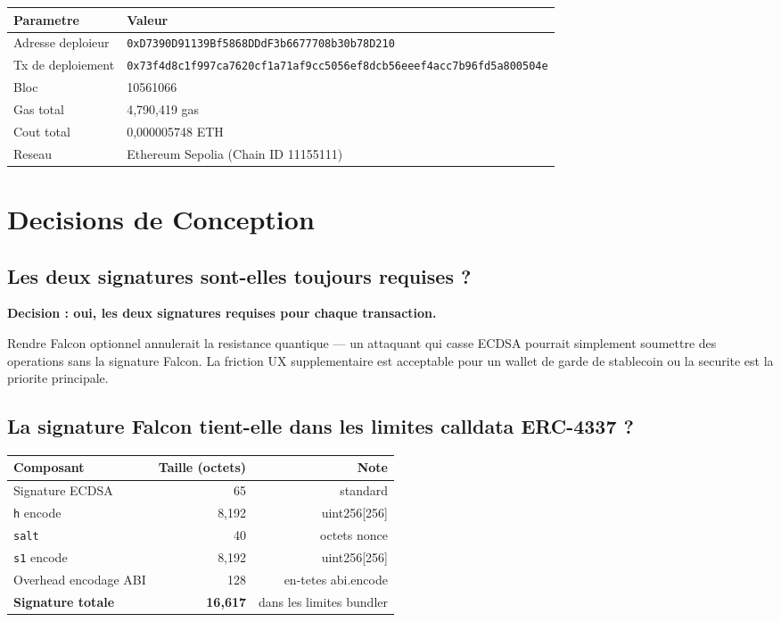 \documentclass[11pt,a4paper]{article}
\begin{document}
\begin{center}
\begin{tabular}{ll}
\toprule
\textbf{Parametre} & \textbf{Valeur} \\
\midrule
Adresse deploieur & \texttt{0xD7390D91139Bf5868DDdF3b6677708b30b78D210} \\
Tx de deploiement & \texttt{0x73f4d8c1f997ca7620cf1a71af9cc5056ef8dcb56eeef4acc7b96fd5a800504e} \\
Bloc              & 10561066 \\
Gas total         & 4,790,419 gas \\
Cout total        & 0,000005748 ETH \\
Reseau            & Ethereum Sepolia (Chain ID 11155111) \\
\bottomrule
\end{tabular}
\end{center}

\section{Decisions de Conception}

\subsection{Les deux signatures sont-elles toujours requises ?}

\textbf{Decision : oui, les deux signatures requises pour chaque transaction.}

Rendre Falcon optionnel annulerait la resistance quantique --- un attaquant qui casse ECDSA
pourrait simplement soumettre des operations sans la signature Falcon. La friction UX
supplementaire est acceptable pour un wallet de garde de stablecoin ou la securite est
la priorite principale.

\subsection{La signature Falcon tient-elle dans les limites calldata ERC-4337 ?}

\begin{center}
\begin{tabular}{lrr}
\toprule
\textbf{Composant} & \textbf{Taille (octets)} & \textbf{Note} \\
\midrule
Signature ECDSA          &    65 & standard \\
\texttt{h} encode        & 8,192 & uint256[256] \\
\texttt{salt}            &    40 & octets nonce \\
\texttt{s1} encode       & 8,192 & uint256[256] \\
Overhead encodage ABI    &   128 & en-tetes abi.encode \\
\midrule
\textbf{Signature totale} & \textbf{16,617} & dans les limites bundler \\
\bottomrule
\end{tabular}
\end{center}
\end{document}
